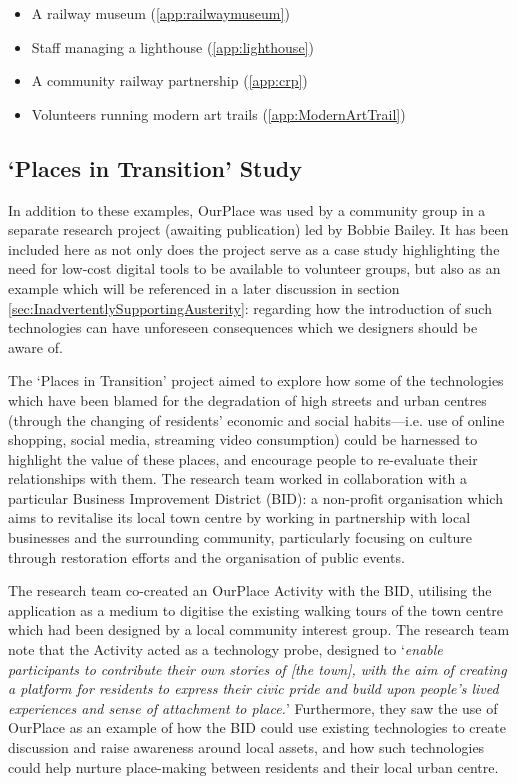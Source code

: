 \begin{itemize}
  \item A railway museum (\ref{app:railwaymuseum})
  \item Staff managing a lighthouse (\ref{app:lighthouse})
  \item A community railway partnership (\ref{app:crp})
  \item Volunteers running modern art trails (\ref{app:ModernArtTrail})
\end{itemize}

\subsection{`Places in Transition' Study}
\label{sec:PlacesInTransition}

In addition to these examples, OurPlace was used by a community group in a separate research project (awaiting publication) led by Bobbie Bailey. It has been included here as not only does the project serve as a case study highlighting the need for low-cost digital tools to be available to volunteer groups, but also as an example which will be referenced in a later discussion in section \ref{sec:InadvertentlySupportingAusterity}: regarding how the introduction of such technologies can have unforeseen consequences which we designers should be aware of.

The `Places in Transition' project aimed to explore how some of the technologies which have been blamed for the degradation of high streets and urban centres (through the changing of residents' economic and social habits---i.e. use of online shopping, social media, streaming video consumption) could be harnessed to highlight the value of these places, and encourage people to re-evaluate their relationships with them. The research team worked in collaboration with a particular Business Improvement District (BID): a non-profit organisation which aims to revitalise its local town centre by working in partnership with local businesses and the surrounding community, particularly focusing on culture through restoration efforts and the organisation of public events.

The research team co-created an OurPlace Activity with the BID, utilising the application as a medium to digitise the existing walking tours of the town centre which had been designed by a local community interest group. The research team note that the Activity acted as a technology probe, designed to `\textit{enable participants to contribute their own stories of [the town], with the aim of creating a platform for residents to express their civic pride and build upon people’s lived experiences and sense of attachment to place.}' Furthermore, they saw the use of OurPlace as an example of how the BID could use existing technologies to create discussion and raise awareness around local assets, and how such technologies could help nurture place-making between residents and their local urban centre.

